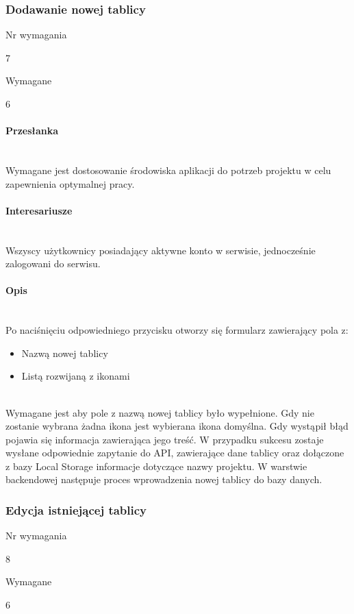 \documentclass[eng,printmode]{mgr}
\begin{document}
\subsubsection{Dodawanie nowej tablicy}
\begin{labeling}{Nr wymagania}
\item [Nr wymagania:] 7
\item [Typ:] Wymagane
\item [Powiązania:] 6
\end{labeling}

\paragraph{Przesłanka}\ \\
Wymagane jest dostosowanie środowiska aplikacji do potrzeb projektu w celu zapewnienia optymalnej pracy.

\paragraph{Interesariusze}\ \\
Wszyscy użytkownicy posiadający aktywne konto w serwisie, jednocześnie zalogowani do serwisu.

\paragraph{Opis}\ \\
Po naciśnięciu odpowiedniego przycisku otworzy się formularz zawierający pola z:
\begin{itemize}
  \item[--] Nazwą nowej tablicy
  \item[--] Listą rozwijaną z ikonami
\end{itemize}
\ \\
Wymagane jest aby pole z nazwą nowej tablicy było wypełnione. Gdy nie zostanie wybrana żadna ikona jest wybierana ikona domyślna. Gdy wystąpił błąd pojawia się informacja zawierająca jego treść. W przypadku sukcesu zostaje wysłane odpowiednie zapytanie do API, zawierające dane tablicy oraz dołączone z bazy Local Storage informacje dotyczące nazwy projektu. W warstwie backendowej następuje proces wprowadzenia nowej tablicy do bazy danych.
\newpage

\subsubsection{Edycja istniejącej tablicy}
\begin{labeling}{Nr wymagania}
\item [Nr wymagania:] 8
\item [Typ:] Wymagane
\item [Powiązania:] 6
\end{labeling}
\end{document}
